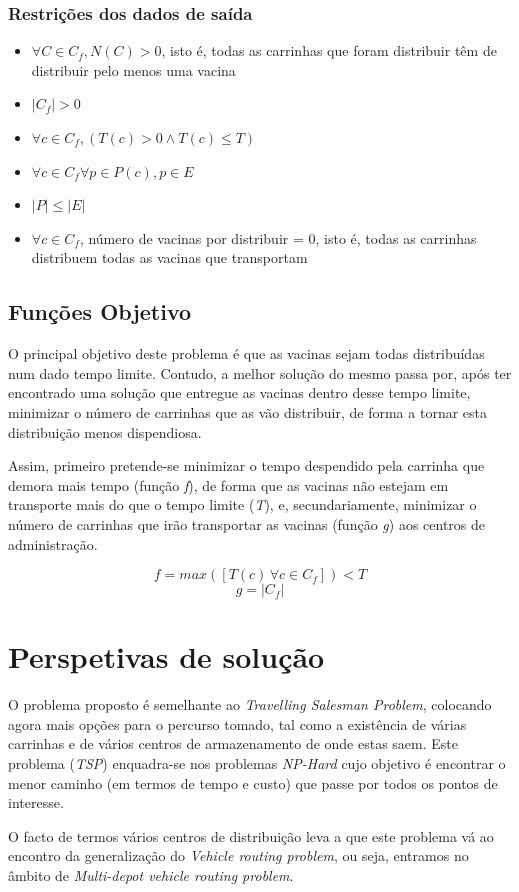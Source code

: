 \documentclass[12pt,a4paper]{report}
\begin{document}
	\subsection{Restrições dos dados de saída}
	\begin{itemize}
		\item \( \forall C \in C_f, N(C) > 0 \), isto é, todas as carrinhas que foram distribuir têm de distribuir pelo menos uma vacina
		\item \( |C_f| > 0 \)
		\item \( \forall c \in C_f, (T(c) > 0 \land T(c) \leq T)\)
		\item \( \forall c \in C_f \forall p \in P(c), p \in E \)
		\item \( |P| \leq |E| \)
		\item \( \forall c \in C_f \), número de vacinas por distribuir = 0, isto é, todas as carrinhas distribuem todas as vacinas que transportam
	\end{itemize}


	\section{Funções Objetivo}
	O principal objetivo deste problema é que as vacinas sejam todas distribuídas num dado tempo limite. Contudo, a melhor solução do mesmo passa por, após ter encontrado uma solução que entregue as vacinas dentro desse tempo limite, minimizar o número de carrinhas que as vão distribuir, de forma a tornar esta distribuição menos dispendiosa. \par
	Assim, primeiro pretende-se minimizar o tempo despendido pela carrinha que demora mais tempo (função \textit{f}), de forma que as vacinas não estejam em transporte mais do que o tempo limite (\textit{T}), e, secundariamente, minimizar o número de carrinhas que irão transportar as vacinas (função \textit{g}) aos centros de administração.

	\[ f = max([T(c)\, \forall c \in C_f]) < T\]
	\[ g = |C_f| \]



\chapter{Perspetivas de solução}
O problema proposto é semelhante ao \textit{Travelling Salesman Problem}, colocando agora mais opções para o percurso tomado, tal como a existência de várias carrinhas e de vários centros de armazenamento de onde estas saem. Este problema (\textit{TSP}) enquadra-se nos problemas \textit{NP-Hard} cujo objetivo é encontrar o menor caminho (em termos de tempo e custo) que passe por todos os pontos de interesse. \par
O facto de termos vários centros de distribuição leva a que este problema vá ao encontro da generalização do \textit{Vehicle routing problem}, ou seja, entramos no âmbito de \textit{Multi-depot vehicle routing problem}.
\end{document}
